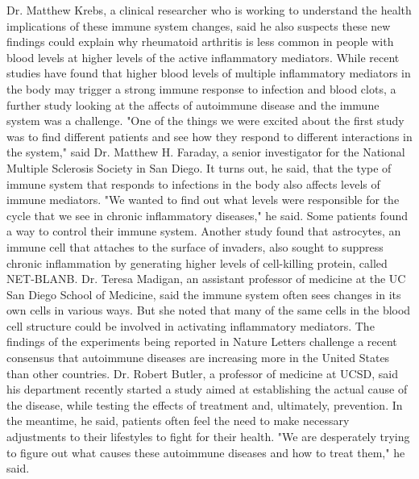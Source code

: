 \documentclass{article}%
\begin{document}
Dr. Matthew Krebs, a clinical researcher who is working to understand the health implications of these immune system changes, said he also suspects these new findings could explain why rheumatoid arthritis is less common in people with blood levels at higher levels of the active inflammatory mediators.\newline%
While recent studies have found that higher blood levels of multiple inflammatory mediators in the body may trigger a strong immune response to infection and blood clots, a further study looking at the affects of autoimmune disease and the immune system was a challenge.\newline%
"One of the things we were excited about the first study was to find different patients and see how they respond to different interactions in the system," said Dr. Matthew H. Faraday, a senior investigator for the National Multiple Sclerosis Society in San Diego.\newline%
It turns out, he said, that the type of immune system that responds to infections in the body also affects levels of immune mediators.\newline%
"We wanted to find out what levels were responsible for the cycle that we see in chronic inflammatory diseases," he said.\newline%
Some patients found a way to control their immune system. Another study found that astrocytes, an immune cell that attaches to the surface of invaders, also sought to suppress chronic inflammation by generating higher levels of cell{-}killing protein, called NET{-}BLANB.\newline%
Dr. Teresa Madigan, an assistant professor of medicine at the UC San Diego School of Medicine, said the immune system often sees changes in its own cells in various ways. But she noted that many of the same cells in the blood cell structure could be involved in activating inflammatory mediators.\newline%
The findings of the experiments being reported in Nature Letters challenge a recent consensus that autoimmune diseases are increasing more in the United States than other countries.\newline%
Dr. Robert Butler, a professor of medicine at UCSD, said his department recently started a study aimed at establishing the actual cause of the disease, while testing the effects of treatment and, ultimately, prevention.\newline%
In the meantime, he said, patients often feel the need to make necessary adjustments to their lifestyles to fight for their health.\newline%
"We are desperately trying to figure out what causes these autoimmune diseases and how to treat them," he said.
\end{document}
